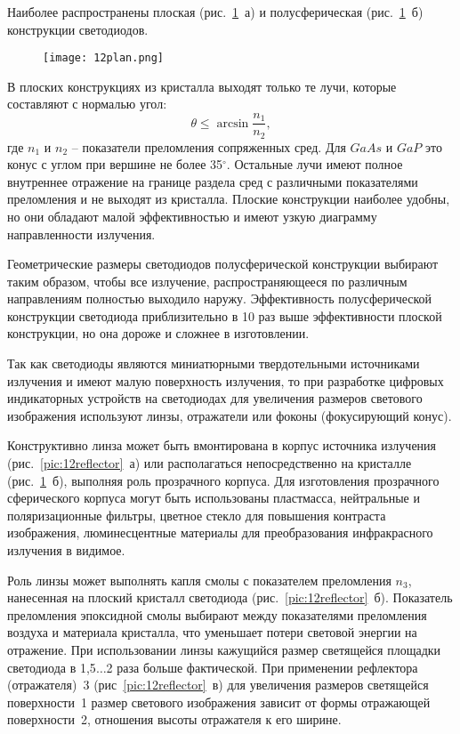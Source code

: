 Наиболее распространены плоская (рис.~\ref{pic:12plan}~а) и полусферическая (рис.~\ref{pic:12plan}~б) конструкции светодиодов.

\begin{figure}[h!]
	\texttt{[image: 12plan.png]}
	\label{pic:12plan}
\end{figure}

В плоских конструкциях из кристалла выходят только те лучи, которые составляют с нормалью угол:
\[ \theta \leq \arcsin\dfrac{n_1}{n_2}, \]
где $ n_1 $ и $ n_2 $ -- показатели преломления сопряженных сред. Для $ GaAs $ и $ GaP $ это конус с углом при вершине не более 35$ ^\circ $. Остальные лучи имеют полное внутреннее отражение на границе раздела сред с различными показателями преломления и не выходят из кристалла. Плоские конструкции наиболее удобны, но они обладают малой эффективностью и имеют узкую диаграмму направленности излучения. 

Геометрические размеры светодиодов полусферической конструкции выбирают таким образом, чтобы все излучение, распространяющееся по различным направлениям полностью выходило наружу. Эффективность полусферической конструкции светодиода приблизительно в 10 раз выше эффективности плоской конструкции, но она дороже и сложнее в изготовлении.

Так как светодиоды являются миниатюрными твердотельными источниками излучения и имеют малую поверхность излучения, то при разработке цифровых индикаторных устройств на светодиодах для увеличения размеров светового изображения используют линзы, отражатели или фоконы (фокусирующий конус). 

Конструктивно линза может быть вмонтирована в корпус источника излучения (рис.~\ref{pic:12reflector}~а) или располагаться непосредственно на кристалле (рис.~\ref{pic:12plan}~б), выполняя роль прозрачного корпуса. Для изготовления прозрачного сферического корпуса могут быть использованы пластмасса, нейтральные и поляризационные фильтры, цветное стекло для повышения контраста изображения, люминесцентные материалы для преобразования инфракрасного излучения в видимое. 

Роль линзы может выполнять капля смолы с показателем преломления $ n_3 $, нанесенная на плоский кристалл светодиода (рис.~\ref{pic:12reflector}~б). Показатель преломления эпоксидной смолы выбирают между показателями преломления воздуха и материала кристалла, что уменьшает потери световой энергии на отражение. При использовании линзы кажущийся размер светящейся площадки светодиода в 1,5$ \ldots $2 раза больше фактической. При применении рефлектора (отражателя)~3 (рис~\ref{pic:12reflector}~в) для увеличения размеров светящейся поверхности~1 размер светового изображения зависит от формы отражающей поверхности~2, отношения высоты отражателя к его ширине.

